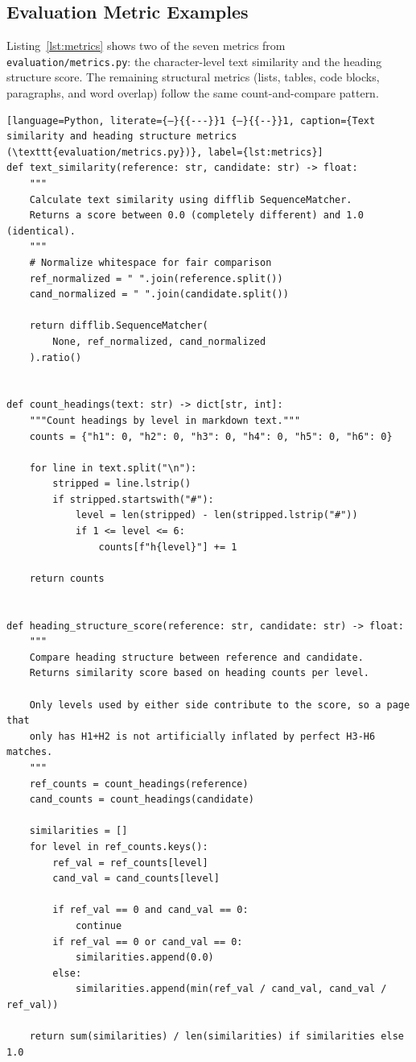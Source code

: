 \subsection{Evaluation Metric Examples}

Listing~\ref{lst:metrics} shows two of the seven metrics from
\texttt{evaluation/metrics.py}: the character-level text similarity and the
heading structure score. The remaining structural metrics (lists, tables,
code blocks, paragraphs, and word overlap) follow the same
count-and-compare pattern.

\begin{lstlisting}[language=Python, literate={—}{{---}}1 {–}{{--}}1, caption={Text similarity and heading structure metrics (\texttt{evaluation/metrics.py})}, label={lst:metrics}]
def text_similarity(reference: str, candidate: str) -> float:
    """
    Calculate text similarity using difflib SequenceMatcher.
    Returns a score between 0.0 (completely different) and 1.0 (identical).
    """
    # Normalize whitespace for fair comparison
    ref_normalized = " ".join(reference.split())
    cand_normalized = " ".join(candidate.split())

    return difflib.SequenceMatcher(
        None, ref_normalized, cand_normalized
    ).ratio()


def count_headings(text: str) -> dict[str, int]:
    """Count headings by level in markdown text."""
    counts = {"h1": 0, "h2": 0, "h3": 0, "h4": 0, "h5": 0, "h6": 0}

    for line in text.split("\n"):
        stripped = line.lstrip()
        if stripped.startswith("#"):
            level = len(stripped) - len(stripped.lstrip("#"))
            if 1 <= level <= 6:
                counts[f"h{level}"] += 1

    return counts


def heading_structure_score(reference: str, candidate: str) -> float:
    """
    Compare heading structure between reference and candidate.
    Returns similarity score based on heading counts per level.

    Only levels used by either side contribute to the score, so a page that
    only has H1+H2 is not artificially inflated by perfect H3-H6 matches.
    """
    ref_counts = count_headings(reference)
    cand_counts = count_headings(candidate)

    similarities = []
    for level in ref_counts.keys():
        ref_val = ref_counts[level]
        cand_val = cand_counts[level]

        if ref_val == 0 and cand_val == 0:
            continue
        if ref_val == 0 or cand_val == 0:
            similarities.append(0.0)
        else:
            similarities.append(min(ref_val / cand_val, cand_val / ref_val))

    return sum(similarities) / len(similarities) if similarities else 1.0
\end{lstlisting}


